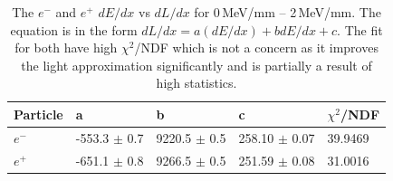 \begin{table}[!h]
\centering
\begin{tabular}{lllll}  
\toprule
Particle       & a                 & b                 & c                 & $\chi^2$/NDF\\
\midrule
$e^-$          & -553.3 $\pm$ 0.7  & 9220.5 $\pm$ 0.5  & 258.10 $\pm$ 0.07 & 39.9469 \\
$e^+$          & -651.1 $\pm$ 0.8  & 9266.5 $\pm$ 0.5  & 251.59 $\pm$ 0.08 & 31.0016 \\
\bottomrule  
\end{tabular}
\caption{The $e^-$ and $e^+$ $dE/dx$ vs $dL/dx$ for 0\,MeV/mm -- 2\,MeV/mm. The equation is in the form $dL/dx = a (dE/dx) + b dE/dx + c$. The fit for both have high $\chi^2$/NDF which is not a concern as it improves the light approximation significantly and is partially a result of high statistics. }
\label{tab:e-e+SquareDlDeTable}
\end{table}

